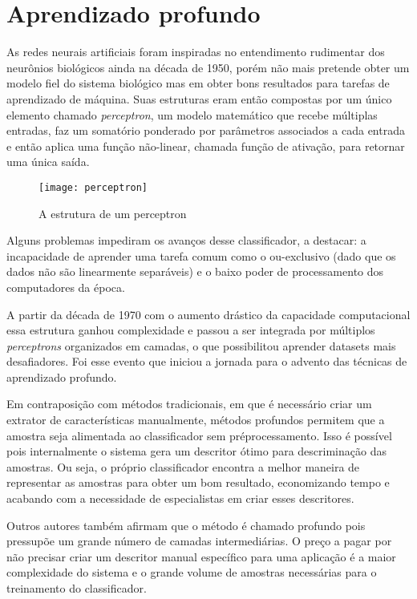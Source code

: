 \section{Aprendizado profundo}
As redes neurais artificiais foram inspiradas no entendimento rudimentar dos neurônios biológicos ainda na década de 1950, porém não mais pretende obter um modelo fiel do sistema biológico mas em obter bons resultados para tarefas de aprendizado de máquina. Suas estruturas eram então compostas por um único elemento chamado \textit{perceptron}, um modelo matemático que recebe múltiplas entradas, faz um somatório ponderado por parâmetros associados a cada entrada e então aplica uma função não-linear, chamada função de ativação, para retornar uma única saída.

\begin{figure}[h]
\caption{A estrutura de um perceptron}
\centering
\texttt{[image: perceptron]}
\label{fig:perceptron}
\end{figure}

Alguns problemas impediram os avanços desse classificador, a destacar: a incapacidade de aprender uma tarefa comum como o ou-exclusivo (dado que os dados não são linearmente separáveis) e o baixo poder de processamento dos computadores da época.

A partir da década de 1970 com o aumento drástico da capacidade computacional essa estrutura ganhou complexidade e passou a ser integrada por múltiplos \textit{perceptrons} organizados em camadas, o que possibilitou aprender datasets mais desafiadores. Foi esse evento que iniciou a jornada para o advento das técnicas de aprendizado profundo.

Em contraposição com métodos tradicionais, em que é necessário criar um extrator de características manualmente, métodos profundos permitem que a amostra seja alimentada ao classificador sem préprocessamento. Isso é possível pois internalmente o sistema gera um descritor ótimo para descriminação das amostras. Ou seja, o próprio classificador encontra a melhor maneira de representar as amostras para obter um bom resultado, economizando tempo e acabando com a necessidade de especialistas em criar esses descritores. %

Outros autores também afirmam que o método é chamado profundo pois pressupõe um grande número de camadas intermediárias. O preço a pagar por não precisar criar um descritor manual específico para uma aplicação é a maior complexidade do sistema e o grande volume de amostras necessárias para o treinamento do classificador.


